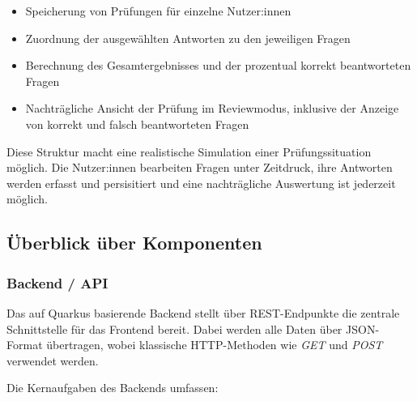 \begin{itemize}
  \item Speicherung von Prüfungen für einzelne Nutzer:innen
  \item Zuordnung der ausgewählten Antworten zu den jeweiligen Fragen
  \item Berechnung des Gesamtergebnisses und der prozentual korrekt beantworteten Fragen
  \item Nachträgliche Ansicht der Prüfung im Reviewmodus, inklusive der Anzeige von korrekt und falsch beantworteten Fragen
\end{itemize}

Diese Struktur macht eine realistische Simulation einer Prüfungssituation möglich. Die Nutzer:innen bearbeiten Fragen unter Zeitdruck, 
ihre Antworten werden erfasst und persisitiert und eine nachträgliche Auswertung ist jederzeit möglich.



\subsection{Überblick über Komponenten}
\setauthor{\firstauthor}


\subsubsection{Backend / API}
Das auf Quarkus basierende Backend stellt über REST-Endpunkte die zentrale Schnittstelle für das Frontend bereit. Dabei werden alle Daten
über JSON-Format übertragen, wobei klassische HTTP-Methoden wie \textit{GET} und \textit{POST} verwendet werden.

Die Kernaufgaben des Backends umfassen:

